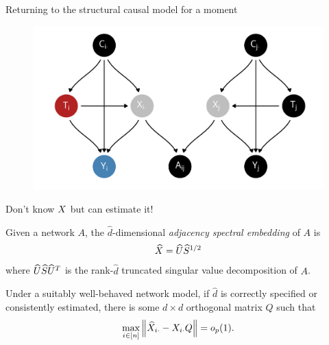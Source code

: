 \documentclass[aspectratio=169]{beamer}
\theoremstyle{remark}
\begin{document}
\begin{frame}{Returning to the structural causal model for a moment}

    \centering

    \begin{figure}
        \includegraphics[scale=0.7]{figures/dags/homophily-mediating.png}
    \end{figure}

\end{frame}

\begin{frame}{Don't know $X$ but can estimate it!}

    \begin{definition}[ASE]

        Given a network $A$, the $\widehat{d}$-dimensional \emph{adjacency spectral embedding} of $A$ is
        \begin{align*}
            \widehat{X} = \widehat{U} \widehat{S}^{1/2}
        \end{align*}
        \noindent where $\widehat{U} \widehat{S} \widehat{U}^T$ is the rank-$\widehat{d}$ truncated singular value decomposition of $A$.

    \end{definition}

    \begin{lemma}

        Under a suitably well-behaved network model, if $\widehat{d}$ is correctly specified or consistently estimated, there is some $d \times d$ orthogonal matrix $Q$ such that
        \begin{equation*}
            \max_{i \in [n]} \, \norm*{\Xhat_{i \cdot} - \X_{i \cdot} Q} = \op{1}.
        \end{equation*}

    \end{lemma}


\end{frame}
\end{document}

